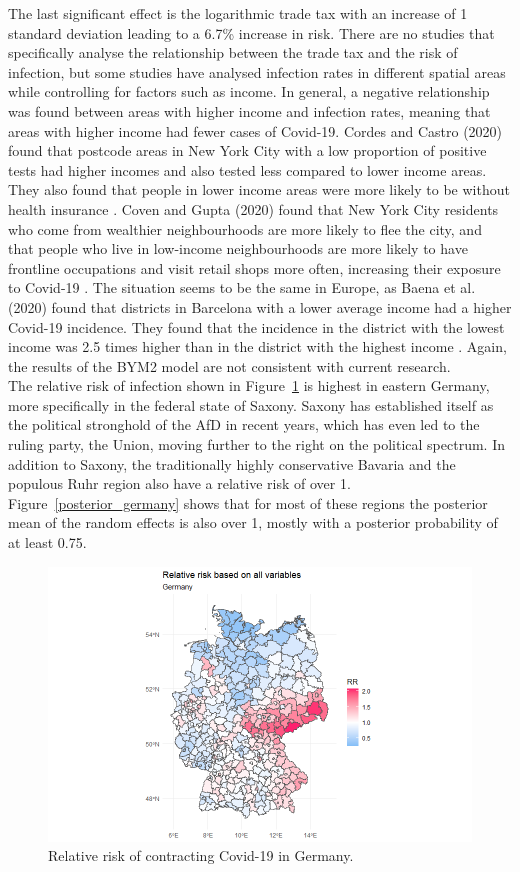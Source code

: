 The last significant effect is the logarithmic trade tax with an increase of 1 standard deviation leading to a 6.7\% increase in risk. There are no studies that specifically analyse the relationship between the trade tax and the risk of infection, but some studies have analysed infection rates in different spatial areas while controlling for factors such as income. In general, a negative relationship was found between areas with higher income and infection rates, meaning that areas with higher income had fewer cases of Covid-19. Cordes and Castro (2020) found that postcode areas in New York City with a low proportion of positive tests had higher incomes and also tested less compared to lower income areas. They also found that people in lower income areas were more likely to be without health insurance \autocite[][]{cordes2020spatial}. Coven and Gupta (2020) found that New York City residents who come from wealthier neighbourhoods are more likely to flee the city, and that people who live in low-income neighbourhoods are more likely to have frontline occupations and visit retail shops more often, increasing their exposure to Covid-19 \autocite[][]{coven2020disparities}. The situation seems to be the same in Europe, as Baena et al. (2020) found that districts in Barcelona with a lower average income had a higher Covid-19 incidence. They found that the incidence in the district with the lowest income was 2.5 times higher than in the district with the highest income \autocite[][]{baena2020impact}. Again, the results of the BYM2 model are not consistent with current research. \\
The relative risk of infection shown in Figure~\ref{rr_germany} is highest in eastern Germany, more specifically in the federal state of Saxony. Saxony has established itself as the political stronghold of the AfD in recent years, which has even led to the ruling party, the Union, moving further to the right on the political spectrum. In addition to Saxony, the traditionally highly conservative Bavaria and the populous Ruhr region also have a relative risk of over 1. Figure~\ref{posterior_germany} shows that for most of these regions the posterior mean of the random effects is also over 1, mostly with a posterior probability of at least 0.75.
\begin{figure}[H]
  \centering
  \includegraphics[width = \textwidth]{relative_risk_germany.png}
  \caption{Relative risk of contracting Covid-19 in Germany.}
  \label{rr_germany}
\end{figure}

